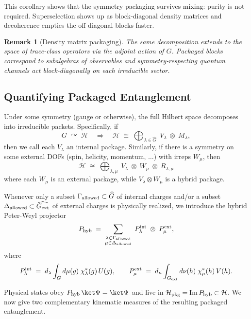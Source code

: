 \documentclass[12pt,a4paper]{article}
\newtheorem{remark}{Remark}
\begin{document}
This corollary shows that the symmetry packaging survives mixing:
purity is not required.
Superselection shows up as block‑diagonal density matrices and decoherence
empties the off‑diagonal blocks faster.



\begin{remark}[Density matrix packaging]
	The same decomposition extends to the space of trace‑class operators via the adjoint action of $G$.
	Packaged blocks correspond to subalgebras of observables and symmetry‑respecting quantum channels act block‑diagonally on each irreducible sector.
\end{remark}



\subsection{Quantifying Packaged Entanglement}
\label{SEC:QuantifyingPackagedEntanglement}


Under some symmetry (gauge or otherwise), the full Hilbert space decomposes into irreducible packets. 
Specifically, if
$$
G\;\curvearrowright\;\mathcal H
\quad\Longrightarrow\quad
\mathcal H
\;\cong\;
\bigoplus_{\lambda\in\widehat G}
\;V_\lambda\;\otimes\;M_\lambda,
$$
then we call each $V_\lambda$ an internal package.
Similarly, if there is a symmetry on some external DOFs (spin, helicity, momentum, $\dots$) with irreps $W_\mu$, then
$$
\mathcal H
\;\cong\;
\bigoplus_{\lambda,\mu}
\;V_\lambda\;\otimes\;W_\mu\;\otimes\;R_{\lambda,\mu}
$$
where each $W_\mu$ is an external package, while $V_\lambda\otimes W_\mu$ is a hybrid package.


Whenever only a subset $\Gamma_{\rm allowed}\subset\widehat G$ of internal charges and/or a subset $\Delta_{\rm allowed}\subset\widehat{G_{\rm ext}}$ of external charges is physically realized, we introduce the hybrid Peter-Weyl projector
$$
P_{\rm hyb}
\;=\;
\sum_{\substack{\lambda\in\Gamma_{\rm allowed}\\\mu\in\Delta_{\rm allowed}}}
\;P^{\rm int}_\lambda\;\otimes\;P^{\rm ext}_\mu,
$$
where
$$
P^{\rm int}_\lambda
\;=\;
d_\lambda
\int_G d\mu(g)\;\chi_\lambda^*(g)\,U(g),
\qquad
P^{\rm ext}_\mu
\;=\;
d_\mu
\int_{G_{\rm ext}} d\nu(h)\;\chi_\mu^*(h)\,V(h).
$$

Physical states obey
$
P_{\rm hyb}\,\ket\Psi
= \ket\Psi
$
and live in
$\mathcal H_{\rm pkg} = \operatorname{Im} P_{\rm hyb} \subset \mathcal H$.
We now give two complementary kinematic measures of the resulting packaged entanglement.
\end{document}
